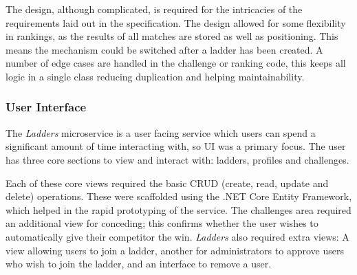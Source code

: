 \par
The design, although complicated, is required for the intricacies of the requirements laid out in the specification. The design allowed for some flexibility in rankings, as the results of all matches are stored as well as positioning. This means the mechanism could be switched after a ladder has been created. A number of edge cases are handled in the challenge or ranking code, this keeps all logic in a single class reducing duplication and helping maintainability.

\subsubsection{User Interface}
\par
The \textit{Ladders} microservice is a user facing service which users can spend a significant amount of time interacting with, so UI was a primary focus. The user has three core sections to view and interact with: ladders, profiles and challenges.

\par
Each of these core views required the basic CRUD (create, read, update and delete) operations. These were scaffolded using the .NET Core Entity Framework, which helped in the rapid prototyping of the service. The challenges area required an additional view for conceding; this confirms whether the user wishes to automatically give their competitor the win. \textit{Ladders} also required extra views: A view allowing users to join a ladder, another for administrators to approve users who wish to join the ladder, and an interface to remove a user.

